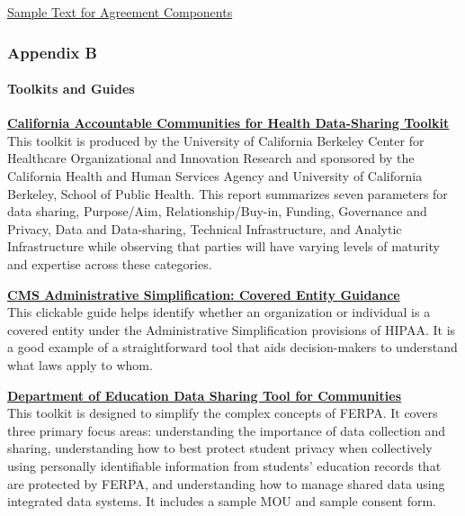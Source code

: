 \documentclass[
]{WileySix}
\begin{document}
\href{./appendix/dua_appendix.pdf}{Sample Text for Agreement Components}

\hypertarget{appendix-b}{%
\subsubsection*{Appendix B}\label{appendix-b}}

\hypertarget{toolkits-and-guides}{%
\paragraph{Toolkits and Guides}\label{toolkits-and-guides}}

\textbf{\href{https://cachi.org/uploads/resources/ACH-Data-Sharing-Toolkit-December-2016.pdf}{California Accountable Communities for Health Data-Sharing Toolkit}}\\
This toolkit is produced by the University of California Berkeley Center for Healthcare Organizational and Innovation Research and sponsored by the California Health and Human Services Agency and University of California Berkeley, School of Public Health. This report summarizes seven parameters for data sharing, Purpose/Aim, Relationship/Buy-in, Funding, Governance and Privacy, Data and Data-sharing, Technical Infrastructure, and Analytic Infrastructure while observing that parties will have varying levels of maturity and expertise across these categories.

\textbf{\href{https://www.cms.gov/Regulations-and-Guidance/Administrative-Simplification/HIPAA-ACA/Downloads/CoveredEntitiesChart20160617.pdf}{CMS Administrative Simplification: Covered Entity Guidance}}\\
This clickable guide helps identify whether an organization or individual is a covered entity under the Administrative Simplification provisions of HIPAA. It is a good example of a straightforward tool that aids decision-makers to understand what laws apply to whom.

\textbf{\href{https://www2.ed.gov/programs/promiseneighborhoods/datasharingtool.pdf}{Department of Education Data Sharing Tool for Communities}}\\
This toolkit is designed to simplify the complex concepts of FERPA. It covers three primary focus areas: understanding the importance of data collection and sharing, understanding how to best protect student privacy when collectively using personally identifiable information from students' education records that are protected by FERPA, and understanding how to manage shared data using integrated data systems. It includes a sample MOU and sample consent form.
\end{document}
